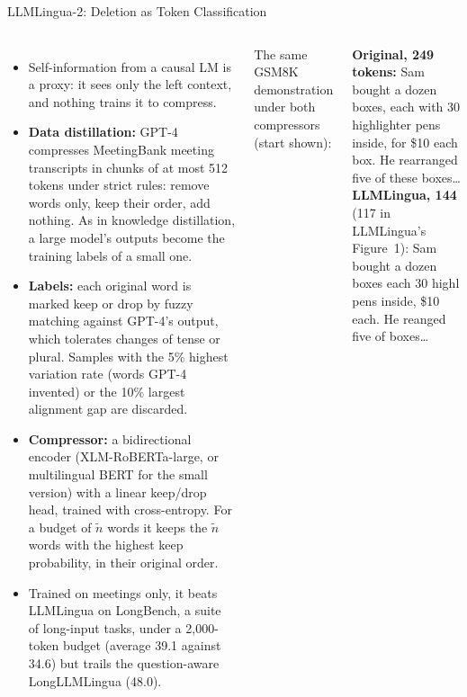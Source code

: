 \begin{frame}{LLMLingua-2: Deletion as Token Classification}
  \begin{columns}[T,onlytextwidth]
      \begin{itemize}\scriptsize\itemsep0.35em
        \item[\textcolor{red}{$\blacktriangleright$}] Self-information from a causal LM is a proxy: it sees only the left context, and nothing trains it to compress.
        \item[\textcolor{red}{$\blacktriangleright$}] \textbf{Data distillation:} GPT-4 compresses MeetingBank meeting transcripts in chunks of at most 512 tokens under strict rules: remove words only, keep their order, add nothing. As in knowledge distillation, a large model's outputs become the training labels of a small one.
        \item[\textcolor{red}{$\blacktriangleright$}] \textbf{Labels:} each original word is marked keep or drop by fuzzy matching against GPT-4's output, which tolerates changes of tense or plural. Samples with the 5\% highest variation rate (words GPT-4 invented) or the 10\% largest alignment gap are discarded.
        \item[\textcolor{red}{$\blacktriangleright$}] \textbf{Compressor:} a bidirectional encoder (XLM-RoBERTa-large, or multilingual BERT for the small version) with a linear keep/drop head, trained with cross-entropy. For a budget of $\tilde n$ words it keeps the $\tilde n$ words with the highest keep probability, in their original order.
        \item[\textcolor{red}{$\blacktriangleright$}] Trained on meetings only, it beats LLMLingua on LongBench, a suite of long-input tasks, under a 2,000-token budget (average 39.1 against 34.6) but trails the question-aware LongLLMLingua (48.0).
      \end{itemize}
      {\scriptsize The same GSM8K demonstration under both compressors (start shown):\par}
      \vspace{0.1em}
      \begin{tcolorbox}[colframe=gray!60, colback=gray!6, boxrule=0.4pt, left=3pt, right=3pt, top=2pt, bottom=2pt]
        \scriptsize\textbf{Original, 249 tokens:} Sam bought a dozen boxes, each with 30 highlighter pens inside, for \$10 each box. He rearranged five of these boxes\ldots\\[0.1em]
        \textbf{LLMLingua, 144} (117 in LLMLingua's Figure~1): Sam bought a dozen boxes each 30 highl pens inside, \$10 each. He reanged five of boxes\ldots\\[0.1em]

\end{tcolorbox}
\end{columns}
\end{frame}

